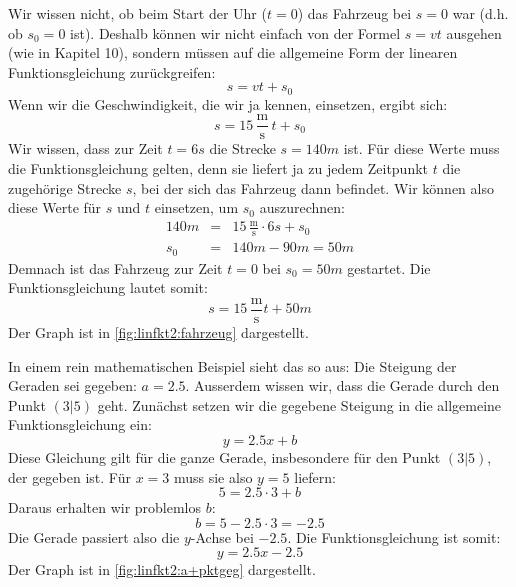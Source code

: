 \documentclass[%
11pt,%
twoside,%
titlepage,%
german,%
headsepline%
]{scrartcl}
\newcommand{\ufrac}[2]{\ensuremath{\,\frac{\mathrm{#1}}{\mathrm{#2}}}}
\begin{document}
{Wir wissen nicht, ob beim Start der Uhr ($t=0$) das Fahrzeug bei $s=0$ war (d.h. ob $s_0=0$ ist). Deshalb k\"onnen wir nicht einfach von der Formel $s=vt$ ausgehen (wie in Kapitel 10), sondern m\"ussen auf die allgemeine Form der linearen Funktionsgleichung zur\"uckgreifen:
\begin{displaymath}
  s = vt + s_0
\end{displaymath}
Wenn wir die Geschwindigkeit, die wir ja kennen, einsetzen, ergibt sich:
\begin{displaymath}
  s = 15\ufrac{m}{s}\,t + s_0
\end{displaymath}
Wir wissen, dass zur Zeit $t=6\unit{s}$ die Strecke $s=140\unit{m}$ ist. F\"ur diese Werte muss die Funktionsgleichung gelten, denn sie liefert ja zu jedem Zeitpunkt $t$ die zugeh\"orige Strecke $s$, bei der sich das Fahrzeug dann befindet. Wir k\"onnen also diese Werte f\"ur $s$ und $t$ einsetzen, um $s_0$ auszurechnen:
\begin{eqnarray*}
  140\unit{m} & = & 15\ufrac{m}{s} \cdot 6\unit{s} + s_0 \\
  s_0 & = & 140\unit{m}-90\unit{m} = 50\unit{m}
\end{eqnarray*}
Demnach ist das Fahrzeug zur Zeit $t=0$ bei $s_0=50\unit{m}$ gestartet. Die Funktionsgleichung lautet somit:
\begin{displaymath}
  s = 15\ufrac{m}{s}t + 50\unit{m}
\end{displaymath}
Der Graph ist in \ref{fig:linfkt2:fahrzeug} dargestellt.

In einem rein mathematischen Beispiel sieht das so aus: Die Steigung der Geraden sei gegeben: $a=2.5$. Ausserdem wissen wir, dass die Gerade durch den Punkt $(3|5)$ geht. Zun\"achst setzen wir die gegebene Steigung in die allgemeine Funktionsgleichung ein:
\begin{displaymath}
  y = 2.5x + b
\end{displaymath}
Diese Gleichung gilt f\"ur die ganze Gerade, insbesondere f\"ur den Punkt $(3|5)$, der gegeben ist. F\"ur $x=3$ muss sie also $y=5$ liefern:
\begin{displaymath}
  5 = 2.5 \cdot 3 + b
\end{displaymath}
Daraus erhalten wir problemlos $b$:
\begin{displaymath}
  b = 5 - 2.5 \cdot 3 = -2.5
\end{displaymath}
Die Gerade passiert also die $y$-Achse bei $-2.5$. Die Funktionsgleichung ist somit:
\begin{displaymath}
  y = 2.5x - 2.5
\end{displaymath}
Der Graph ist in \ref{fig:linfkt2:a+pktgeg} dargestellt.

}
\end{document}

